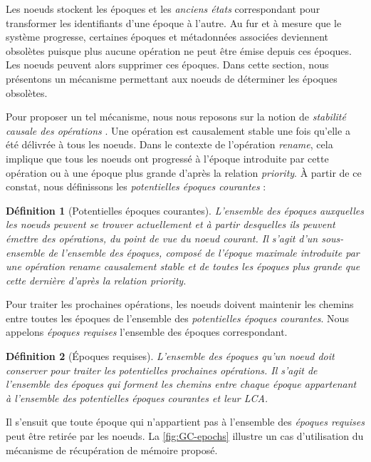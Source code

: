 \documentclass[12pt]{thesul}
\newtheorem{definition}{Définition}
\begin{document}
\label{sec:gc-mechanism}

Les noeuds stockent les époques et les \emph{anciens états} correspondant pour transformer les identifiants d'une époque à l'autre.
Au fur et à mesure que le système progresse, certaines époques et métadonnées associées deviennent obsolètes puisque plus aucune opération ne peut être émise depuis ces époques.
Les noeuds peuvent alors supprimer ces époques.
Dans cette section, nous présentons un mécanisme permettant aux noeuds de déterminer les époques obsolètes.

Pour proposer un tel mécanisme, nous nous reposons sur la notion de \emph{stabilité causale des opérations} \cite{10.1007/978-3-662-43352-2_11}.
Une opération est causalement stable une fois qu'elle a été délivrée à tous les noeuds.
Dans le contexte de l'opération \emph{rename}, cela implique que tous les noeuds ont progressé à l'époque introduite par cette opération ou à une époque plus grande d'après la relation \emph{priority}.
À partir de ce constat, nous définissons les \emph{potentielles époques courantes} :

\begin{definition}[Potentielles époques courantes]
  L'ensemble des époques auxquelles les noeuds peuvent se trouver actuellement et à partir desquelles ils peuvent émettre des opérations, du point de vue du noeud courant.
  Il s'agit d'un sous-ensemble de l'ensemble des époques, composé de l'époque maximale introduite par une opération \emph{rename} causalement stable et de toutes les époques plus grande que cette dernière d'après la relation \emph{priority}.
\end{definition}

Pour traiter les prochaines opérations, les noeuds doivent maintenir les chemins entre toutes les époques de l'ensemble des \emph{potentielles époques courantes}.
Nous appelons \emph{époques requises} l'ensemble des époques correspondant.

\begin{definition}[Époques requises]
  L'ensemble des époques qu'un noeud doit conserver pour traiter les potentielles prochaines opérations.
  Il s'agit de l'ensemble des époques qui forment les chemins entre chaque époque appartenant à l'ensemble des \emph{potentielles époques courantes} et leur \ac{LCA}.
\end{definition}

Il s'ensuit que toute époque qui n'appartient pas à l'ensemble des \emph{époques requises} peut être retirée par les noeuds.
La \autoref{fig:GC-epochs} illustre un cas d'utilisation du mécanisme de récupération de mémoire proposé.
\end{document}
